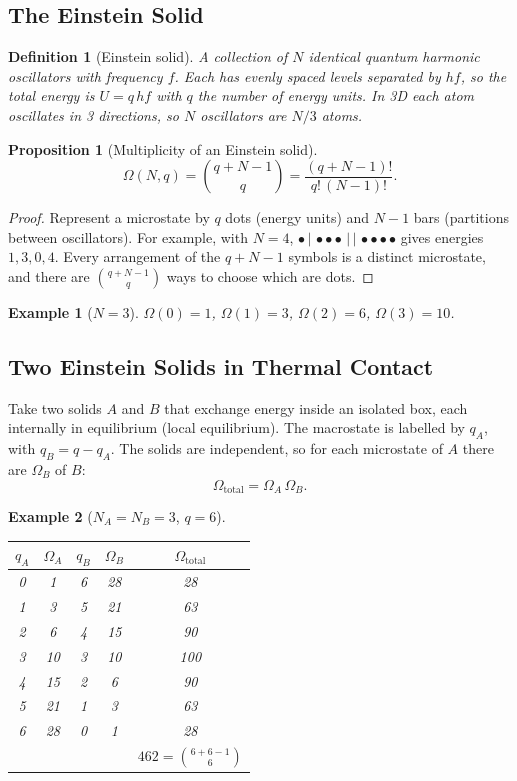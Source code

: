 \documentclass{article}
\newtheorem{definition}{Definition}
\newtheorem*{example}{Example}
\newtheorem{proposition}{Proposition}
\begin{document}
\subsection{The Einstein Solid}
\begin{definition}[Einstein solid]
    A collection of $N$ identical quantum harmonic oscillators with frequency $f$. Each has evenly spaced levels separated by $hf$, so the total energy is $U = q\,hf$ with $q$ the number of energy units. In 3D each atom oscillates in 3 directions, so $N$ oscillators are $N/3$ atoms.
\end{definition}

\begin{proposition}[Multiplicity of an Einstein solid]
    \[\Omega(N, q) = \binom{q + N - 1}{q} = \frac{(q + N - 1)!}{q!\,(N-1)!}.\]
\end{proposition}
\begin{proof}
    Represent a microstate by $q$ dots (energy units) and $N - 1$ bars (partitions between oscillators). For example, with $N = 4$, $\bullet \,|\, \bullet\bullet\bullet \,|\,|\, \bullet\bullet\bullet\bullet$ gives energies $1, 3, 0, 4$. Every arrangement of the $q + N - 1$ symbols is a distinct microstate, and there are $\binom{q+N-1}{q}$ ways to choose which are dots.
\end{proof}
\begin{example}[$N = 3$]
    $\Omega(0) = 1$, $\Omega(1) = 3$, $\Omega(2) = 6$, $\Omega(3) = 10$.
\end{example}

\subsection{Two Einstein Solids in Thermal Contact}
Take two solids $A$ and $B$ that exchange energy inside an isolated box, each internally in equilibrium (local equilibrium). The macrostate is labelled by $q_A$, with $q_B = q - q_A$. The solids are independent, so for each microstate of $A$ there are $\Omega_B$ of $B$:
\[\Omega_{\text{total}} = \Omega_A\,\Omega_B.\]

\begin{example}[$N_A = N_B = 3$, $q = 6$]
    \begin{center}
    \begin{tabular}{ccccc}
        $q_A$ & $\Omega_A$ & $q_B$ & $\Omega_B$ & $\Omega_{\text{total}}$ \\
        \hline
        0 & 1 & 6 & 28 & 28 \\
        1 & 3 & 5 & 21 & 63 \\
        2 & 6 & 4 & 15 & 90 \\
        3 & 10 & 3 & 10 & 100 \\
        4 & 15 & 2 & 6 & 90 \\
        5 & 21 & 1 & 3 & 63 \\
        6 & 28 & 0 & 1 & 28 \\
        \hline
        & & & & $462 = \binom{6+6-1}{6}$
    \end{tabular}
    \end{center}
\end{example}
\end{document}
